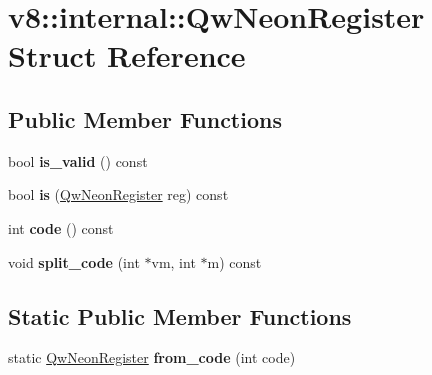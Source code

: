 \hypertarget{structv8_1_1internal_1_1_qw_neon_register}{}\section{v8\+:\+:internal\+:\+:Qw\+Neon\+Register Struct Reference}
\label{structv8_1_1internal_1_1_qw_neon_register}
\subsection*{Public Member Functions}
\begin{DoxyCompactItemize}
\item 
bool {\bfseries is\+\_\+valid} () const \hypertarget{structv8_1_1internal_1_1_qw_neon_register_aa375350cb44c6327d5ac2a6a66b73f4a}{}\label{structv8_1_1internal_1_1_qw_neon_register_aa375350cb44c6327d5ac2a6a66b73f4a}

\item 
bool {\bfseries is} (\hyperlink{structv8_1_1internal_1_1_qw_neon_register}{Qw\+Neon\+Register} reg) const \hypertarget{structv8_1_1internal_1_1_qw_neon_register_a7647df6331ff9688ef19e44e443e5dfa}{}\label{structv8_1_1internal_1_1_qw_neon_register_a7647df6331ff9688ef19e44e443e5dfa}

\item 
int {\bfseries code} () const \hypertarget{structv8_1_1internal_1_1_qw_neon_register_af2824b4dc8c2ef5e7ce081c45a4db410}{}\label{structv8_1_1internal_1_1_qw_neon_register_af2824b4dc8c2ef5e7ce081c45a4db410}

\item 
void {\bfseries split\+\_\+code} (int $\ast$vm, int $\ast$m) const \hypertarget{structv8_1_1internal_1_1_qw_neon_register_a71231194e3b7807305bc7ee8775c3965}{}\label{structv8_1_1internal_1_1_qw_neon_register_a71231194e3b7807305bc7ee8775c3965}

\end{DoxyCompactItemize}
\subsection*{Static Public Member Functions}
\begin{DoxyCompactItemize}
\item 
static \hyperlink{structv8_1_1internal_1_1_qw_neon_register}{Qw\+Neon\+Register} {\bfseries from\+\_\+code} (int code)\hypertarget{structv8_1_1internal_1_1_qw_neon_register_ae7fbf25072ca8f8769980cff5a697918}{}\label{structv8_1_1internal_1_1_qw_neon_register_ae7fbf25072ca8f8769980cff5a697918}

\end{DoxyCompactItemize}
